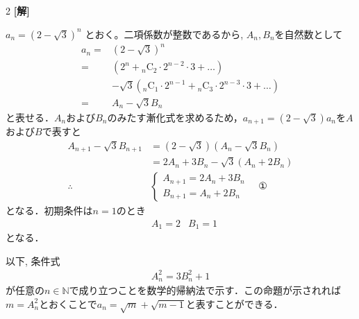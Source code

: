 \documentclass[../../main.tex]{subfiles}
\begin{document}
\setcounter{equation}{0}
\setcounter{figure}{0}
\setcounter{table}{0}
\begin{oframed}
  
\end{oframed}
\setlength{\columnseprule}{0.4pt}
\begin{multicols}{2}
  {\bf[解]}

  $a_n = (2-\sqrt{3})^n$ とおく。二項係数が整数であるから,
  $A_n, B_n$を自然数として
  \begin{align*}
    a_n
    = & (2-\sqrt{3})^n                                                                             \\
    = & (2^n + {}_n\mathrm{C}_2 \cdot 2^{n-2} \cdot 3 + \dots)                                     \\
      & -\sqrt{3}({}_n\mathrm{C}_1 \cdot 2^{n-1} + {}_n\mathrm{C}_3 \cdot 2^{n-3} \cdot 3 + \dots) \\
    = & A_n - \sqrt{3}B_n
  \end{align*}
  と表せる．$A_n$および$B_n$のみたす漸化式を求めるため，$a_{n+1}=(2-\sqrt{3})a_{n}$を$A$および$B$で表すと
  \begin{align*}
    A_{n+1} - \sqrt{3}B_{n+1}
               & = (2-\sqrt{3})(A_n - \sqrt{3}B_n)    \\
               & = 2A_n + 3B_n - \sqrt{3}(A_n + 2B_n) \\
    \therefore &
    \begin{cases}
      A_{n+1} = 2A_n+ 3B_n \\
      B_{n+1} = A_n + 2B_n
    \end{cases} \quad \text{①}
  \end{align*}
  となる．初期条件は$n=1$のとき
  \begin{align}\label{1994-2:eq:2}
     & A_{1} = 2 & B_{1} = 1
  \end{align}
  となる．

  以下, 条件式
  \begin{align}\label{1994-2:eq:3}
    A_n^2 = 3B_n^2 + 1
  \end{align}
  が任意の$n \in \mathbb{N}$で成り立つことを数学的帰納法で示す．この命題が示されれば$m=A_{n}^2$とおくことで$a_{n}=\sqrt{m}+\sqrt{m-1}$と表すことができる．


\end{multicols}
\end{document}
